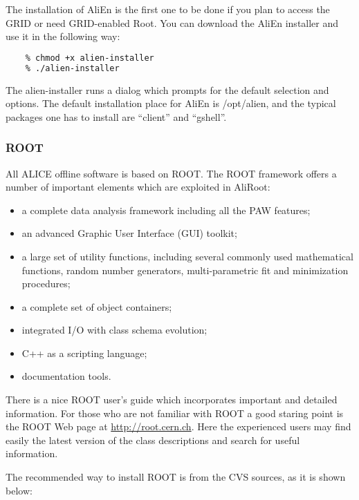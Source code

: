 \documentclass[12pt,a4paper,twoside]{article}
\begin{document}
The installation of AliEn is the first one to be done if you plan to
access the GRID or need GRID-enabled Root. You can download the AliEn
installer and use it in the following way:
  \begin{lstlisting}[language=sh, title={AliEn installation}]
    % wget http://alien.cern.ch/alien-installer
    % chmod +x alien-installer
    % ./alien-installer
  \end{lstlisting}
The alien-installer runs a dialog which prompts for the default
selection and options. The default installation place for AliEn is
/opt/alien, and the typical packages one has to install are ``client''
and ``gshell''.

\subsubsection{ROOT}

All ALICE offline software is based on ROOT\cite{ROOT}. The ROOT
framework offers a number of important elements which are exploited in
AliRoot:

\begin{itemize}
\item a complete data analysis framework including all the PAW
  features;
\item an advanced Graphic User Interface (GUI) toolkit;
\item a large set of utility functions, including several commonly
  used mathematical functions, random number generators,
  multi-parametric fit and minimization procedures;
\item a complete set of object containers; 
\item integrated I/O with class schema evolution;
\item C++ as a scripting language;
\item documentation tools.
\end{itemize}
There is a nice ROOT user's guide which incorporates important and
detailed information. For those who are not familiar with ROOT a good
staring point is the ROOT Web page at \url{http://root.cern.ch}. Here
the experienced users may find easily the latest version of the class
descriptions and search for useful information.

\noindent
The recommended way to install ROOT is from the CVS sources, as it is
shown below:
\end{document}
